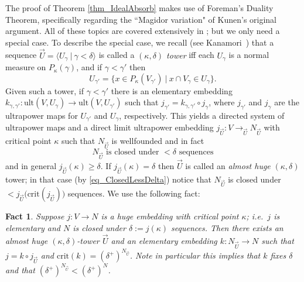 \documentclass{amsart}
\newtheorem{fact}[theorem]{Fact}
\begin{document}
The proof of Theorem \ref{thm_IdealAbsorb} makes use of Foreman's Duality Theorem, specifically regarding the ``Magidor variation" of Kunen's original argument.  All of these topics are covered extensively in \cite{MattHandbook}; but we only need a special case.  To describe the special case, we recall (see Kanamori~\cite{MR1994835}) that a sequence $\vec{U} = \langle U_\gamma \ | \ \gamma < \delta \rangle$ is called a \emph{$(\kappa,\delta)$ tower} iff each $U_\gamma$ is a normal measure on $P_\kappa(\gamma)$, and if $\gamma < \gamma'$ then
\[
U_{\gamma'} = \{ x \in P_\kappa(V_{\gamma'}) \ | \ x \cap V_\gamma \in U_\gamma  \}.
\]
Given such a tower, if $\gamma < \gamma'$ there is an elementary embedding $k_{\gamma,\gamma'}: \text{ult}(V,U_\gamma) \to \text{ult}(V,U_{\gamma'})$ such that $j_{\gamma'} = k_{\gamma,\gamma'} \circ j_\gamma$, where $j_{\gamma'}$ and $j_{\gamma}$ are the ultrapower maps for $U_{\gamma'}$ and $U_{\gamma}$, respectively.  This yields a directed system of ultrapower maps and a direct limit ultrapower embedding $j_{\vec{U}}: V \to_{\vec{U}} N_{\vec{U}}$ with critical point $\kappa$ such that $N_{\vec{U}}$ is wellfounded and in fact
\begin{equation}\label{eq_ClosedLessDelta}
N_{\vec{U}} \text{ is closed under } <\delta \text{ sequences}
\end{equation}
and in general $j_{\vec{U}}(\kappa) \ge \delta$.  If $j_{\vec{U}}(\kappa) = \delta$ then $\vec{U}$ is called an \emph{almost huge} $(\kappa,\delta)$ tower; in that case (by \eqref{eq_ClosedLessDelta}) notice that $N_{\vec{U}}$ is closed under $< j_{\vec{U}}\big(\text{crit}(j_{\vec{U}})\big)$ sequences.  We use the following fact:
\begin{fact}\label{fact_DerivedAlmostHuge}
Suppose $j:V \to N$ is a huge embedding with critical point $\kappa$; i.e.\ $j$ is elementary and $N$ is closed under $\delta:= j(\kappa)$ sequences.  Then there exists an almost huge $(\kappa,\delta)$-tower $\vec{U}$ and an elementary embedding $k: N_{\vec{U}} \to N$ such that $j = k \circ j_{\vec{U}}$ and $\text{crit}(k) = (\delta^+)^{N_{\vec{U}}}$.  Note in particular this implies that $k$ fixes $\delta$ and that $(\delta^+)^{N_{\vec{U}}}  < (\delta^+)^{N}$.
\end{fact}
\end{document}
